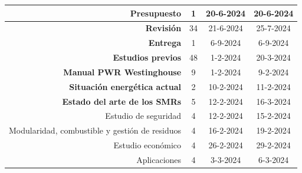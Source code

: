 \begin{table}[!h]
\begin{tabular}{|r|c|c|c|}
    \rowcolor[HTML]{CBE5CB} 
    \textbf{Presupuesto}                                         & 1                         & 20-6-2024                         & 20-6-2024                         \\ \hline
    \rowcolor[HTML]{CBE5CB} 
    \textbf{Revisión}                                            & 34                         & 21-6-2024                         & 25-7-2024                         \\ \hline
    \rowcolor[HTML]{CBE5CB} 
    \textbf{Entrega}                                             & 1                         & 6-9-2024                         & 6-9-2024                         \\ \hline
    \rowcolor[HTML]{FFCE93} 
    \textbf{Estudios previos}                                    & 48                        & 1-2-2024                          & 20-3-2024                         \\ \hline
    \rowcolor[HTML]{CBE5CB} 
    \cellcolor[HTML]{CBE5CB}\textbf{Manual PWR Westinghouse}     & 9                         & 1-2-2024                          & 9-2-2024                          \\ \hline
    \rowcolor[HTML]{CBE5CB} 
    \textbf{Situación energética actual}                         & 2                         & 10-2-2024                         & 11-2-2024                         \\ \hline
    \rowcolor[HTML]{CBE5CB} 
    \textbf{Estado del arte de los SMRs}                         & 5                         & 12-2-2024                         & 16-3-2024                         \\ \hline
    \rowcolor[HTML]{ECF4FF} 
    Estudio de seguridad                                         & 4                         & 12-2-2024                         & 15-2-2024                         \\ \hline
    \rowcolor[HTML]{ECF4FF} 
    Modularidad, combustible y gestión de residuos               & 4                         & 16-2-2024                         & 19-2-2024                         \\ \hline
    \rowcolor[HTML]{ECF4FF} 
    Estudio económico                                            & 4                         & 26-2-2024                         & 29-2-2024                         \\ \hline
    \rowcolor[HTML]{ECF4FF} 
    Aplicaciones                                                 & 4                         & 3-3-2024                          & 6-3-2024                          \\ \hline

\end{tabular}
\end{table}
